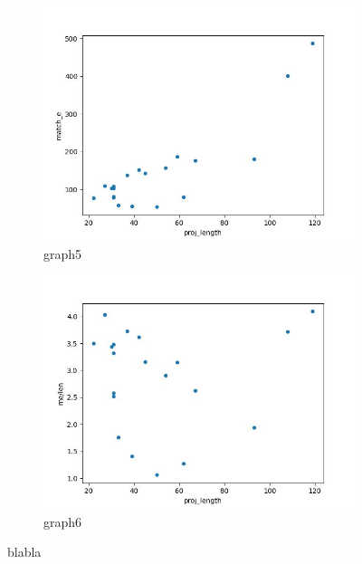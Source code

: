 \documentclass[12pt,a4paper]{article}
\begin{document}
\begin{figure}[H]
\begin{subfigure}[t]{0.5\linewidth}
		\includegraphics[width=1\linewidth]{plots/lenVSme.jpg}
		\caption{graph5}
		\label{sub:graph5}
	\end{subfigure}
	\begin{subfigure}[t]{0.5\linewidth}
		\centering
		\includegraphics[width=1\linewidth]{plots/lenVSmelen.jpg}
		\caption{graph6}
		\label{sub:graph6}	
	\end{subfigure}
	\caption{blabla}
	\label{fig:graphs}
\end{figure}
\end{document}

